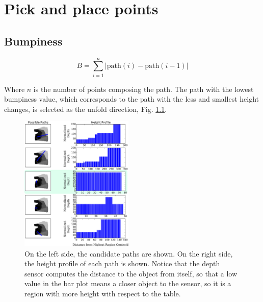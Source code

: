 \chapter{Pick and place points}

\section{Bumpiness}
\begin{equation}\label{bumpiness}
B = \sum_{i=1}^{n} | \textrm{path}(i)- \textrm{path}(i-1) | 
\end{equation}

Where $n$ is the number of points composing the path. The path with the lowest bumpiness value, which corresponds to the path with the less and smallest height changes, is selected as the unfold direction, Fig. \ref{candidate_paths}.



\begin{figure}[thpb]
    \centering
    \includegraphics[width=0.48\textwidth]{figures/candidate_paths.pdf}
    \caption{On the left side, the candidate paths are shown. On the right side, the height profile of each path is shown. Notice that the depth sensor computes the distance to the object from itself, so that a low value in the bar plot means a closer object to the sensor, so it is a region with more height with respect to the table.}
    \label{candidate_paths}
\end{figure}

